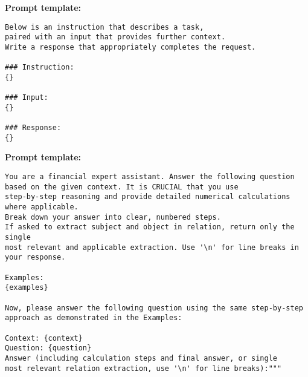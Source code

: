 \documentclass[logo,msc]{infthesis}           %
\begin{document}
\label{sec:Prompt template-llama3-8b}
\begin{tcolorbox}[
    colback=blue!5!white, %
    colframe=white!75!black, %
    width=\textwidth, %
    boxrule=0.5mm, %
    sharp corners, %
    title=PROMPT TEMPLATE FOR LLAMA3-8B,
    fonttitle=\bfseries,
    coltitle=black,
    toptitle=3mm, %
    bottomtitle=3mm %
    ]

\textbf{Prompt template:}


\begin{lstlisting}[language={}, basicstyle=\ttfamily\small, frame=single, backgroundcolor=\color{gray!10}]
Below is an instruction that describes a task, 
paired with an input that provides further context. 
Write a response that appropriately completes the request.

### Instruction:
{}

### Input:
{}

### Response:
{}
\end{lstlisting}

\end{tcolorbox}

\label{sec:Prompt template-llama3-8b-fsp}
\begin{tcolorbox}[
    colback=blue!5!white, %
    colframe=white!75!black, %
    width=\textwidth, %
    boxrule=0.5mm, %
    sharp corners, %
    title=PROMPT TEMPLATE FOR LLAMA3-8B WITH FSP,
    fonttitle=\bfseries,
    coltitle=black,
    toptitle=3mm, %
    bottomtitle=3mm %
    ]

\textbf{Prompt template:} \\

\begin{lstlisting}[language={}, basicstyle=\ttfamily\small, frame=single, backgroundcolor=\color{gray!10}, breaklines=true]
You are a financial expert assistant. Answer the following question 
based on the given context. It is CRUCIAL that you use 
step-by-step reasoning and provide detailed numerical calculations where applicable. 
Break down your answer into clear, numbered steps. 
If asked to extract subject and object in relation, return only the single 
most relevant and applicable extraction. Use '\n' for line breaks in your response.

Examples:
{examples}

Now, please answer the following question using the same step-by-step 
approach as demonstrated in the Examples:

Context: {context}
Question: {question}
Answer (including calculation steps and final answer, or single 
most relevant relation extraction, use '\n' for line breaks):"""
\end{lstlisting}

\end{tcolorbox}
\end{document}
